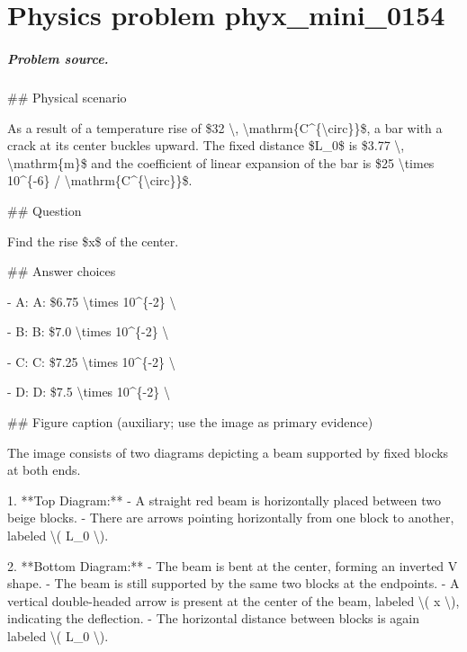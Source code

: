 
\chapter{Physics problem phyx\_mini\_0154}
\label{ch:PhyXMiniProblems_problem_phyx_mini_0154}

\paragraph{Problem source.}
\#\# Physical scenario

As a result of a temperature rise of \$32 \textbackslash{}, \textbackslash{}mathrm\{C\textasciicircum{}\{\textbackslash{}circ\}\}\$, a bar with a crack at its center buckles upward. The fixed distance \$L\_0\$ is \$3.77 \textbackslash{}, \textbackslash{}mathrm\{m\}\$ and the coefficient of linear expansion of the bar is \$25 \textbackslash{}times 10\textasciicircum{}\{-6\} / \textbackslash{}mathrm\{C\textasciicircum{}\{\textbackslash{}circ\}\}\$.

\#\# Question

Find the rise \$x\$ of the center.

\#\# Answer choices

- A: A: \$6.75 \textbackslash{}times 10\textasciicircum{}\{-2\} \textbackslash{}

- B: B: \$7.0 \textbackslash{}times 10\textasciicircum{}\{-2\} \textbackslash{}

- C: C: \$7.25 \textbackslash{}times 10\textasciicircum{}\{-2\} \textbackslash{}

- D: D: \$7.5 \textbackslash{}times 10\textasciicircum{}\{-2\} \textbackslash{}

\#\# Figure caption (auxiliary; use the image as primary evidence)

The image consists of two diagrams depicting a beam supported by fixed blocks at both ends.

1. **Top Diagram:**
   - A straight red beam is horizontally placed between two beige blocks.
   - There are arrows pointing horizontally from one block to another, labeled \textbackslash{}( L\_0 \textbackslash{}).

2. **Bottom Diagram:**
   - The beam is bent at the center, forming an inverted V shape.
   - The beam is still supported by the same two blocks at the endpoints.
   - A vertical double-headed arrow is present at the center of the beam, labeled \textbackslash{}( x \textbackslash{}), indicating the deflection.
   - The horizontal distance between blocks is again labeled \textbackslash{}( L\_0 \textbackslash{}).

